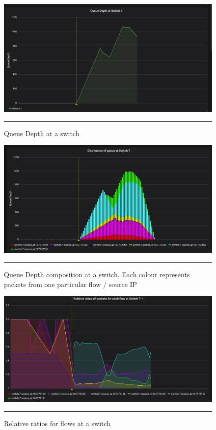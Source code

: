 \begin{figure}[htbp]
	\centering
		\includegraphics[width=1.0\columnwidth]{Figures/queue_depth_simple.png}
		\rule{35em}{0.5pt}
	\caption[Queue Depth Simple]{Queue Depth at a switch}
	\label{fig:QDSimple}
\end{figure}

\begin{figure}[htbp]
	\centering
		\includegraphics[width=1.0\columnwidth]{Figures/queue_depth_composition.png}
		\rule{35em}{0.5pt}
	\caption[Queue Depth composition]{Queue Depth composition at a switch. Each colour represents packets from one particular flow / source IP}
	\label{fig:QDRatio}
\end{figure}

\begin{figure}[htbp]
	\centering
		\includegraphics[width=1.0\columnwidth]{Figures/ratio_absolute.png}
		\rule{35em}{0.5pt}
	\caption[Relative Ratios]{Relative ratios for flows at a switch}
	\label{fig:QDAbsolute}
\end{figure}

